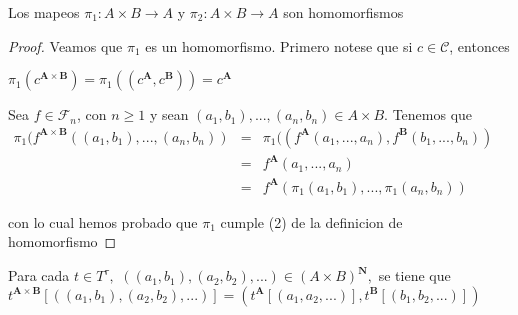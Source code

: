   \begin{lemma}
    Los mapeos \(\pi _{1}:A\times B\rightarrow A\) y \(\pi _{2}:A\times B\rightarrow A\) son homomorfismos
  \end{lemma}
  \begin{proof}
    Veamos que \(\pi _{1}\) es un homomorfismo. Primero notese que si \(c\in \mathcal{C}\), entonces

    \(\displaystyle \pi _{1}(c^{\mathbf{A}\times \mathbf{B}})=\pi _{1}((c^{\mathbf{A}},c^{ \mathbf{B}}))=c^{\mathbf{A}} \)

    Sea \(f\in \mathcal{F}_{n}\), con \(n\geq 1\) y sean \( (a_{1},b_{1}),...,(a_{n},b_{n})\in A\times B\). Tenemos que
    \(\displaystyle \begin{array}{ccl} \pi _{1}(f^{\mathbf{A}\times \mathbf{B}}((a_{1},b_{1}),...,(a_{n},b_{n})) & = & \pi _{1}((f^{\mathbf{A}}(a_{1},...,a_{n}),f^{\mathbf{B}}(b_{1},...,b_{n})) \\ & = & f^{\mathbf{A}}(a_{1},...,a_{n}) \\ & = & f^{\mathbf{A}}(\pi _{1}(a_{1},b_{1}),...,\pi _{1}(a_{n},b_{n})) \end{array} \)

    con lo cual hemos probado que \(\pi _{1}\) cumple (2) de la definicion de homomorfismo
  \end{proof}

  \begin{lemma}
    Para cada \(t\in T^{\tau },\) \(((a_{1},b_{1}),(a_{2},b_{2}),...)\in (A\times B)^{\mathbf{N}},\) se tiene que \(t^{\mathbf{A}\times \mathbf{B} }[((a_{1},b_{1}),(a_{2},b_{2}),...)]=(t^{\mathbf{A}}[(a_{1},a_{2},...)],t^{ \mathbf{B}}[(b_{1},b_{2},...)])\)
  \end{lemma}

